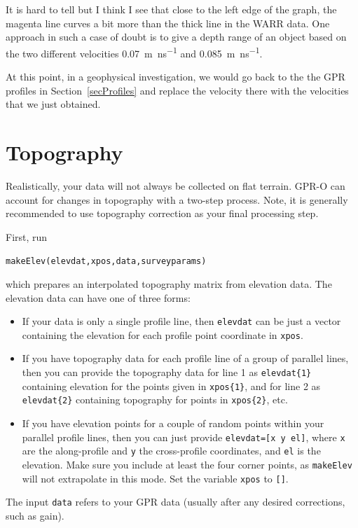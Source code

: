 \documentclass[11pt]{article}
\begin{document}
It is hard to tell but I think I see that close to the left edge of
the graph, the magenta line curves a bit more than the thick line in
the WARR data.  One approach in such a case of doubt is to give a
depth range of an object based on the two different velocities
\SI{0.07}{m\per\ns} and \SI{0.085}{m\per\ns}.

At this point, in a geophysical investigation, we would go back to the
the GPR profiles in Section~\ref{secProfiles} and replace the velocity
there with the velocities that we just obtained.

\section{Topography}

Realistically, your data will not always be collected on flat terrain. 
GPR-O can account for changes in topography with a two-step process. Note,
it is generally recommended to use topography correction as your final
processing step.

First, run

\qquad \verb#makeElev(elevdat,xpos,data,surveyparams)#

which prepares an interpolated topography matrix from elevation
data. The elevation data can have one of three forms:
\begin{itemize}
\item If your data is only a single profile line, then \verb#elevdat# can be
  just a vector containing the elevation for each profile point
  coordinate in \verb#xpos#.
\item If you have topography data for each profile line of a group of
  parallel lines, then you can provide the topography data for line 1 as
  \verb#elevdat{1}# containing elevation for the points given in
  \verb#xpos{1}#, and for line 2 as \verb#elevdat{2}# containing
  topography for points in \verb#xpos{2}#, etc.
\item If you have elevation points for a couple of random points
  within your parallel profile lines, then you can just provide
  \verb#elevdat=[x y el]#, where \verb#x# are the along-profile and
  \verb#y# the cross-profile coordinates, and \verb#el# is the
  elevation. Make sure you include at least the four corner points, as
  \verb#makeElev# will not extrapolate in this mode. Set the variable
  \verb#xpos# to \verb#[]#.
\end{itemize}

The input \verb#data# refers to your GPR data (usually after any desired corrections, such as gain).
\end{document}
